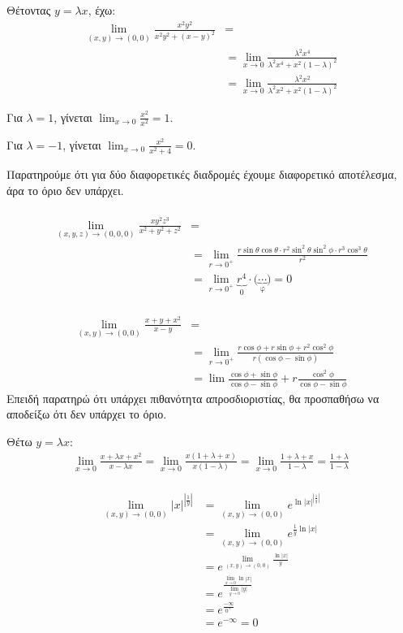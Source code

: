\documentclass[11pt,a4paper,titlepage,draft]{article}
\begin{document}
Θέτοντας \(y=\lambda x\), έχω:
\begin{align*}
\lim_{(x,y) \to(0,0)} \frac{x^2y^2}{x^2y^2+(x-y)^2}
&= \\ &=
\lim_{x \to 0} \frac{\lambda^2x^4}{\lambda^2x^4+x^2(1-\lambda)^2} \\
&=
\lim_{x \to 0} \frac{\lambda^2x^2}{\lambda^2x^2+x^2(1-\lambda)^2}
\end{align*}

Για \(\lambda=1\), γίνεται \(\lim_{x\to 0} \frac{x^2}{x^2}=1\).

Για \(\lambda=-1\), γίνεται \(\lim_{x\to 0} \frac{x^2}{x^2+4} = 0\).

Παρατηρούμε ότι για δύο διαφορετικές διαδρομές έχουμε διαφορετικό αποτέλεσμα, άρα το όριο δεν υπάρχει.

\paragraph{}
\begin{align*}
\lim_{(x,y,z)\to(0,0,0)} \frac{xy^2z^3}{x^2+y^2+z^2}
&=\\&=
\lim_{r\to0^+} \frac{r\sin\theta\cos\theta \cdot r^2\sin^2\theta\sin^2\phi \cdot r^3\cos^3\theta}{r^2} \\ &=
\lim_{r\to0^+} \underbrace{r^4}_{0} \cdot \big( \underbrace{ \cdots }_\text{φ} \big) = 0
\end{align*}

\paragraph{}
\begin{align*}
\lim_{(x,y)\to(0,0)} \frac{x+y+x^2}{x-y}
&= \\ &=
\lim_{r\to0^+} \frac{r\cos\phi+r\sin\phi+r^2\cos^2\phi}{r(\cos\phi-\sin\phi)}
\\ &= \lim
\frac{\cos\phi+\sin\phi}{\cos\phi-\sin\phi} + r
\frac{\cos^2\phi}{\cos\phi-\sin\phi}
\end{align*}
Επειδή παρατηρώ ότι υπάρχει πιθανότητα απροσδιοριστίας, θα προσπαθήσω να αποδείξω ότι δεν υπάρχει το όριο.

Θέτω \(y = \lambda x\):
\begin{align*}
\lim_{x\to0}\frac{x+\lambda x+x^2}{x-\lambda x} =
\lim_{x\to0}\frac{x(1+\lambda+x)}{x(1-\lambda)} =
\lim_{x\to0}\frac{1+\lambda+x}{1-\lambda} = \frac{1+\lambda}{1-\lambda}
\end{align*}

\paragraph{}
\begin{align*}
\lim_{(x,y)\to(0,0)} |x|^{|\frac{1}{y}|} &=
\lim_{(x,y)\to(0,0)} e^{\ln|x|^{|\frac{1}{y}|}} \\ &=
\lim_{(x,y)\to(0,0)} e^{\frac{1}{y} \ln |x|} \\ &=
e^{  \lim_{(x,y)\to(0,0)} \frac{\ln|x|}{y}   } \\ &=
e^{ \frac{\lim_{x\to0} \ln|x|  }{\lim_{y\to0} |y| }} \\ &=
e^\frac{-\infty}{0^+} \\ &= e^{-\infty} = 0
\end{align*}
\end{document}
